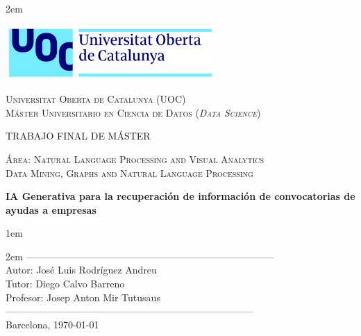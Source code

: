 \newpage
\thispagestyle{empty}

\baselineskip 2em


\centerline{\includegraphics[width=0.6\textwidth]{images/UOC-logo}}
\begin{center}
\textsc{Universitat Oberta de Catalunya (UOC) \\
 Máster Universitario en Ciencia de Datos (\textit{Data Science})\\}


\vspace*{1.5cm}

\textsc{\Large TRABAJO FINAL DE MÁSTER}

\vspace*{0.5cm}

\textsc{\large Área: Natural Language Processing and Visual Analytics\\}
\textsc{\large Data Mining, Graphs and Natural Language Processing}


\vspace*{2.0cm}

\textbf{\Large IA Generativa para la recuperación de información de convocatorias de ayudas a empresas}


\vspace{2.5cm}
\baselineskip 1em

\baselineskip 2em
-----------------------------------------------------------------------------\\
Autor:      José Luis Rodríguez Andreu\\
Tutor:      Diego Calvo Barreno\\
Profesor:   Josep Anton Mir Tutusaus\\
-----------------------------------------------------------------------------\\
\vspace*{1.5cm}
Barcelona, \today

\end{center}

\newpage
\pagestyle{empty}
\hfill

